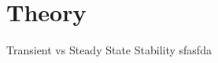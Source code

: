 \section[Theory]{Theory}
\label{sec:lasso_theory}

\begin{frame}[fragile]{Transient vs Steady State Stability}
	sfasfda
\end{frame}